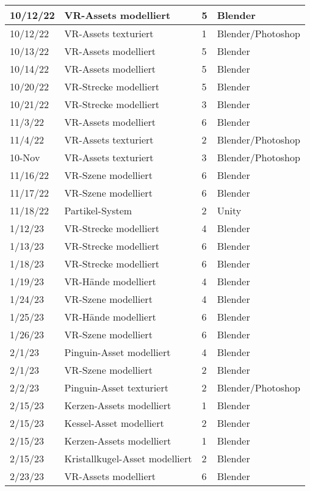 \begin{longtable}{|p{1.5cm}|p{5.5cm}|p{1.2cm}|p{3.2cm}|}
	10/12/22 & VR-Assets modelliert & 5 & Blender \\ \hline
	10/12/22 & VR-Assets texturiert & 1 & Blender/Photoshop \\ \hline
	10/13/22 & VR-Assets modelliert & 5 & Blender \\ \hline
	10/14/22 & VR-Assets modelliert & 5 & Blender \\ \hline
	10/20/22 & VR-Strecke modelliert & 5 & Blender \\ \hline
	10/21/22 & VR-Strecke modelliert & 3 & Blender \\ \hline
	11/3/22 & VR-Assets modelliert & 6 & Blender \\ \hline
	11/4/22 & VR-Assets texturiert & 2 & Blender/Photoshop \\ \hline
	10-Nov & VR-Assets texturiert & 3 & Blender/Photoshop \\ \hline
	11/16/22 & VR-Szene modelliert & 6 & Blender  \\ \hline
	11/17/22 & VR-Szene modelliert & 6 & Blender  \\ \hline
	11/18/22 & Partikel-System & 2 & Unity \\ \hline
	1/12/23 & VR-Strecke modelliert & 4 & Blender \\ \hline
	1/13/23 & VR-Strecke modelliert & 6 & Blender \\ \hline
	1/18/23 & VR-Strecke modelliert & 6 & Blender \\ \hline
	1/19/23 & VR-Hände modelliert & 4 & Blender \\ \hline
	1/24/23 & VR-Szene modelliert & 4 & Blender \\ \hline
	1/25/23 & VR-Hände modelliert & 6 & Blender \\ \hline
	1/26/23 & VR-Szene modelliert & 6 & Blender \\ \hline
	2/1/23 & Pinguin-Asset modelliert & 4 & Blender \\ \hline
	2/1/23 & VR-Szene modelliert & 2 & Blender \\ \hline
	2/2/23 & Pinguin-Asset texturiert & 2 & Blender/Photoshop \\ \hline
	2/15/23 & Kerzen-Assets modelliert & 1 & Blender \\ \hline
	2/15/23 & Kessel-Asset modelliert & 2 & Blender \\ \hline
	2/15/23 & Kerzen-Assets modelliert & 1 & Blender \\ \hline
	2/15/23 & Kristallkugel-Asset modelliert & 2 & Blender \\ \hline
	2/23/23 & VR-Assets modelliert & 6 & Blender \\ \hline

\end{longtable}
